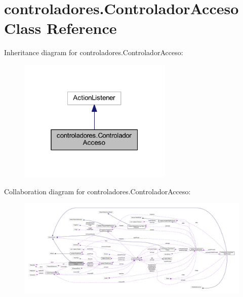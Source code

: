 \hypertarget{classcontroladores_1_1_controlador_acceso}{}\section{controladores.\+Controlador\+Acceso Class Reference}
\label{classcontroladores_1_1_controlador_acceso}


Inheritance diagram for controladores.\+Controlador\+Acceso\+:
\nopagebreak
\begin{figure}[H]
\begin{center}
\leavevmode
\includegraphics[width=208pt]{classcontroladores_1_1_controlador_acceso__inherit__graph}
\end{center}
\end{figure}


Collaboration diagram for controladores.\+Controlador\+Acceso\+:
\nopagebreak
\begin{figure}[H]
\begin{center}
\leavevmode
\includegraphics[width=350pt]{classcontroladores_1_1_controlador_acceso__coll__graph}
\end{center}
\end{figure}
